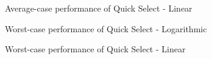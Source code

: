 \documentclass{article}
\begin{document}
\begin{figure}[H]   
  \caption{Average-case performance of Quick Select - Linear}
\end{figure}
\begin{figure}[H]   
  \caption{Worst-case performance of Quick Select - Logarithmic}
\end{figure}
\begin{figure}[H]   
  \caption{Worst-case performance of Quick Select - Linear}
\end{figure}
\end{document}
